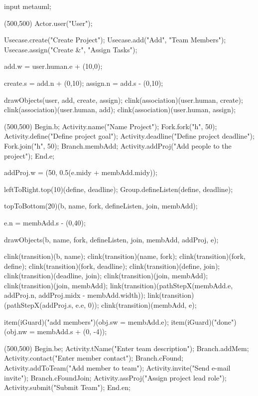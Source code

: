 \begin{empfile}
\begin{empcmds}
input metauml;
\end{empcmds}

\begin{empdef}[usecasediag](500,500)
  Actor.user("User");

  Usecase.create("Create Project");
  Usecase.add("Add", "Team Members");
  Usecase.assign("Create &", "Assign Tasks");

  add.w = user.human.e + (10,0);

  create.s = add.n + (0,10);
  assign.n = add.s - (0,10);
  
  
  drawObjects(user, add, create, assign);
  clink(association)(user.human, create);
  clink(association)(user.human, add);
  clink(association)(user.human, assign);
\end{empdef}

\begin{empdef}[activityR1](500,500)
Begin.b;
Activity.name("Name Project");
Fork.fork("h", 50);
Activity.define("Define project goal");
Activity.deadline("Define project deadline");
Fork.join("h", 50);
Branch.membAdd;
Activity.addProj("Add people to the project");
End.e;

addProj.w = (50, 0.5(e.midy + membAdd.midy));


leftToRight.top(10)(define, deadline);
Group.defineListen(define, deadline);

topToBottom(20)(b, name, fork, defineListen, join, membAdd);

e.n = membAdd.s - (0,40);

drawObjects(b, name, fork, defineListen, join, membAdd, addProj, e);

clink(transition)(b, name);
clink(transition)(name, fork);
clink(transition)(fork, define);
clink(transition)(fork, deadline);
clink(transition)(define, join);
clink(transition)(deadline, join);
clink(transition)(join, membAdd);
clink(transition)(join, membAdd);
link(transition)(pathStepX(membAdd.e, addProj.n,  addProj.midx - membAdd.width));
link(transition)(pathStepX(addProj.s, e.e, 0));
clink(transition)(membAdd, e);

item(iGuard)("add members")(obj.sw = membAdd.e);
item(iGuard)("done")(obj.nw = membAdd.s + (0, -4));
\end{empdef}

\begin{empdef}[activityR2](500,500)
Begin.be;
Activity.tName("Enter team description");
Branch.addMem;
Activity.contact("Enter member contact");
Branch.cFound;
Activity.addToTeam("Add member to team");
Activity.invite("Send e-mail invite");
Branch.cFoundJoin;
Activity.assProj("Assign project lead role");
Activity.submit("Submit Team");
End.en;


\end{empdef}
\end{empfile}
